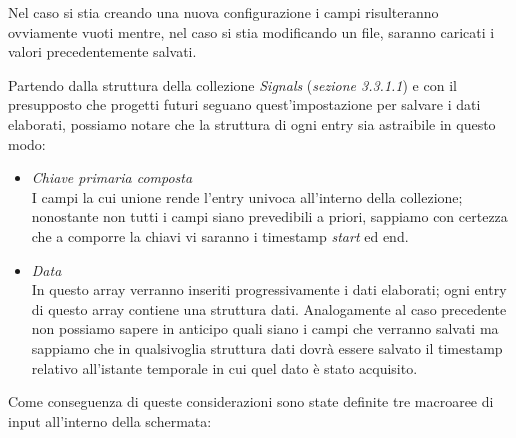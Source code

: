 \noindent Nel caso si stia creando una nuova configurazione i campi risulteranno ovviamente vuoti mentre, nel caso si stia modificando un file, saranno caricati i valori precedentemente salvati.\newline

\noindent Partendo dalla struttura della collezione \emph{Signals} (\emph{sezione 3.3.1.1}) e con il presupposto che progetti futuri seguano quest'impostazione per salvare i dati elaborati, possiamo notare che la struttura di ogni entry sia astraibile in questo modo:
\begin{itemize}
    \item \emph{Chiave primaria composta}\\
    {I campi la cui unione rende l'entry univoca all'interno della collezione; nonostante non tutti i campi siano prevedibili a priori, sappiamo con certezza che a comporre la chiavi vi saranno i timestamp \emph{start} ed {end}.}
    \item \emph{Data}\\
    {In questo array verranno inseriti progressivamente i dati elaborati; ogni entry di questo array contiene una struttura dati.\newline
    \noindent Analogamente al caso precedente non possiamo sapere in anticipo quali siano i campi che verranno salvati ma sappiamo che in qualsivoglia struttura dati dovrà essere salvato il timestamp relativo all'istante temporale in cui quel dato è stato acquisito.}
\end{itemize}
\noindent Come conseguenza di queste considerazioni sono state definite tre macroaree di input all'interno della schermata:
